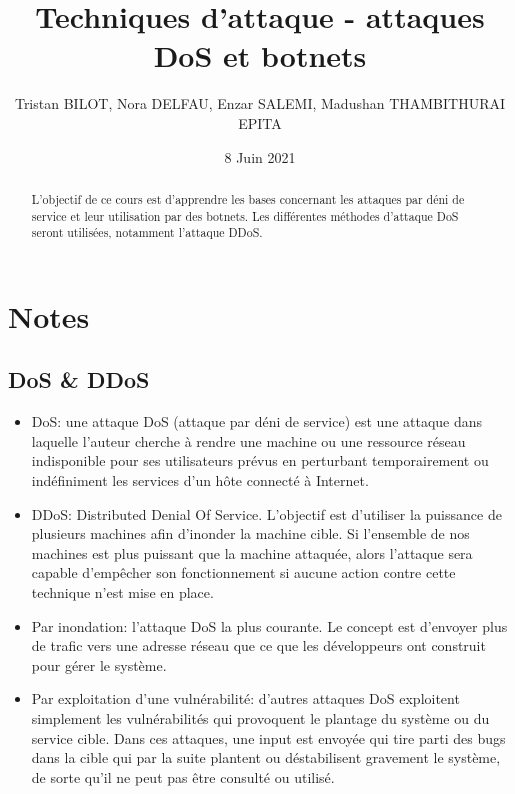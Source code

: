 \documentclass[12pt, oneside]{article}
\begin{document}
\title{Techniques d'attaque - attaques DoS et botnets}
\author{Tristan BILOT, Nora DELFAU, Enzar SALEMI, Madushan THAMBITHURAI\\EPITA}
\date{8 Juin 2021}
\maketitle

\begin{abstract}
L'objectif de ce cours est d'apprendre les bases concernant les attaques par déni de service et leur utilisation par des botnets. Les différentes méthodes d'attaque DoS seront utilisées, notamment l'attaque DDoS.
\end{abstract}

\section{Notes}
\subsection{DoS \& DDoS}

\begin{itemize}
\item DoS: une attaque DoS (attaque par déni de service) est une attaque  dans laquelle l'auteur cherche à rendre une machine ou une ressource réseau indisponible pour ses utilisateurs prévus en perturbant temporairement ou indéfiniment les services d'un hôte connecté à Internet.

\item DDoS: Distributed Denial Of Service. L'objectif est d'utiliser la puissance de plusieurs machines afin d'inonder la machine cible. Si l'ensemble de nos machines est plus puissant que la machine attaquée, alors l'attaque sera capable d'empêcher son fonctionnement si aucune action contre cette technique n'est mise en place.
\end{itemize}

\begin{itemize}
\item Par inondation: l'attaque DoS la plus courante. Le concept est d'envoyer plus de trafic vers une adresse réseau que ce que les développeurs ont construit pour gérer le système.

\item Par exploitation d'une vulnérabilité: d'autres attaques DoS exploitent simplement les vulnérabilités qui provoquent le plantage du système ou du service cible. Dans ces attaques, une input est envoyée qui tire parti des bugs dans la cible qui par la suite plantent ou déstabilisent gravement le système, de sorte qu'il ne peut pas être consulté ou utilisé.
\end{itemize}
\end{document}
